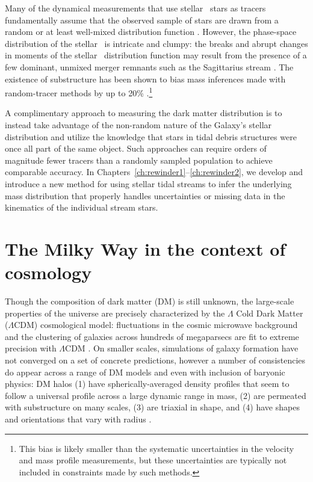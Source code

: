 Many of the dynamical measurements that use stellar \mwhalo\ stars as tracers
fundamentally assume that the observed sample of stars are drawn from a random
or at least well-mixed distribution function \citep[e.g.,][]{battaglia05,
kafle12, kafle14}. However, the phase-space distribution of the stellar \mwhalo\
is intricate and clumpy: the breaks and abrupt changes in moments of the stellar
\mwhalo\ distribution function may result from the presence of a few dominant,
unmixed merger remnants such as the Sagittarius stream \citep[which contains
almost as much stellar mass as the rest of the stellar \mwhalo\
combined;][]{niedersteostholt10}. The existence of substructure has been shown
to bias mass inferences made with random-tracer methods by up to 20\%
\citep[certain orbits will be represented more than others as opposed to being
random;][]{yencho06}.\footnote{This bias is likely smaller than the systematic
uncertainties in the velocity and mass profile measurements, but these
uncertainties are typically not included in constraints made by such methods.}

A complimentary approach to measuring the dark matter distribution is to instead
take advantage of the non-random nature of the Galaxy's stellar distribution and
utilize the knowledge that stars in tidal debris structures were once all part
of the same object. Such approaches can require orders of magnitude fewer
tracers than a randomly sampled population to achieve comparable accuracy. In
Chapters~\ref{ch:rewinder1}--\ref{ch:rewinder2}, we develop and introduce a new
method for using stellar tidal streams to infer the underlying mass distribution
that properly handles uncertainties or missing data in the kinematics of the
individual stream stars.

\section{The Milky Way in the context of cosmology} \label{sec:mw-context}

Though the composition of dark matter (DM) is still unknown, the large-scale
properties of the universe are precisely characterized by the $\Lambda$ Cold
Dark Matter ($\Lambda$CDM) cosmological model: fluctuations in the cosmic
microwave background and the clustering of galaxies across hundreds of
megaparsecs are fit to extreme precision with $\Lambda$CDM \citep{planck15,
sanchez12}. On smaller scales, simulations of galaxy formation have not
converged on a set of concrete predictions, however a number of consistencies do
appear across a range of DM models and even with inclusion of baryonic physics:
DM halos (1) have spherically-averaged density profiles that seem to follow a
universal profile across a large dynamic range in mass, (2) are permeated with
substructure on many scales, (3) are triaxial in shape, and (4) have shapes and
orientations that vary with radius \citep{dubinski91, navarro96, jing02,
kuhlen07, veraciro11}.

